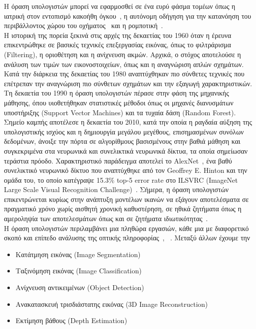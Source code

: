 \documentclass[12pt]{article}
\numberwithin{equation}{section}
\begin{document}
\noindent Η όραση υπολογιστών μπορεί να εφαρμοσθεί σε ένα ευρύ φάσμα τομέων όπως η ιατρική στον εντοπισμό κακοήθη όγκου~\cite{Esteva2021}, η αυτόνομη οδήγηση για την κατανόηση του περιβάλλοντος χώρου του οχήματος~\cite{unknown1} και η ρομποτική~\cite{article1}. \\

Η ιστορική της πορεία ξεκινά στις αρχές της δεκαετίας του 1960 όταν η έρευνα επικεντρώθηκε σε βασικές τεχνικές επεξεργασίας εικόνας, όπως το φιλτράρισμα (Filtering), η οριοθέτηση και η ανίχνευση ακμών. Αρχικά, ο στόχος αποτελούσε η ανάλυση των τιμών των εικονοστοιχείων, όπως και η αναγνώριση απλών σχημάτων. Κατά την διάρκεια της δεκαετίας του 1980 αναπτύχθηκαν πιο σύνθετες τεχνικές που επέτρεπαν την αναγνώριση πιο σύνθετων σχημάτων και την εξαγωγή χαρακτηριστικών. Τη δεκαετία του 1990 η όραση υπολογιστών πέρασε στην φάση της μηχανικής μάθησης, όπου υιοθετήθηκαν στατιστικές μέθοδοι όπως οι μηχανές διανυσμάτων υποστήριξης (Support Vector Machines) και τα τυχαία δάση (Random Forest). Σημείο καμπής αποτέλεσε η δεκαετία του 2010, κατά την οποία η ραγδαία αύξηση της υπολογιστικής ισχύος και η δημιουργία μεγάλου μεγέθους, επισημασμένων συνόλων δεδομένων, άνοιξε την πόρτα σε αλγορίθμους βασισμένους στην βαθιά μάθηση και συγκεκριμένα στα νευρωνικά και συνελικτικά νευρωνικά δίκτυα, τα οποία σημείωσαν τεράστια πρόοδο. Χαρακτηριστικό παράδειγμα αποτελεί το AlexNet~\cite{NIPS2012_c399862d}, ένα βαθύ συνελικτικό νευρωνικό δίκτυο που αναπτύχθηκε από τον Geoffrey E. Hinton και την ομάδα του, το οποίο κατέγραψε 15.3\% top-5 error rate στο ILSVRC (ImageNet
Large Scale Visual Recognition Challenge)~\cite{russakovsky2015imagenetlargescalevisual}. Σήμερα, η όραση υπολογιστών επικεντρώνεται κυρίως στην ανάπτυξη μοντέλων ικανών να εξάγουν αποτελέσματα σε πραγματικό χρόνο χωρίς αισθητή χρονική καθυστέρηση, σε ηθικά ζητήματα όπως η αμεροληψία των αποτελεσμάτων όπως και σε ζητήματα ιδιωτικότητας~\cite{article2}. \\

\noindent Η όραση υπολογιστών περιλαμβάνει μια πληθώρα εργασιών, κάθε μια με διαφορετικό σκοπό και επίπεδο ανάλυσης της οπτικής πληροφορίας~\cite{boesch2024computer}, ~\cite{zhou2024comprehensive}. Μεταξύ άλλων έχουμε την

\begin{itemize}
    \item Κατάτμηση εικόνας (Image Segmentation)
    \item Ταξινόμηση εικόνας (Image Classification)
    \item Ανίχνευση αντικειμένων (Object Detection)
    \item Ανακατασκευή τρισδιάστατης εικόνας (3D Image Reconstruction)
    \item Εκτίμηση βάθους (Depth Estimation) 
\end{itemize}
\end{document}
